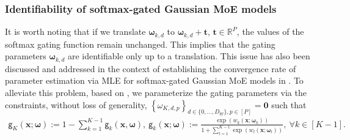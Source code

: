 \documentclass{article}
\newcommand{\mdg}{softmax-gated Gaussian MoE }
\newcommand{\zero}{\ensuremath{\mathbf{0}}}
\def\sfg{\mathsf{g}}
\def\vomega{{\bm{\omega}}}
\def\vt{{\bm{t}}}
\def\vx{{\bm{x}}}
\def\sR{{\mathbb{R}}}
\begin{document}
\subsubsection{Identifiability of \mdg models}\label{section_identifiability_SGMoE}
It is worth noting that if we translate $\vomega_{k,d}$ to $\vomega_{k,d}+\vt$, $\vt \in \sR^{P}$, the values of the softmax gating function remain unchanged. This implies that the gating parameters $\vomega_{k,d}$ are identifiable only up to a translation. This issue has also been discussed and addressed in the context of establishing the convergence rate of parameter estimation via MLE for \mdg models in \cite{nguyen_demystifying_2023}.
To alleviate this problem, based on \cite{hennig2000identifiablity,jiang1999identifiability}, we parameterize the gating parameters via the constraints, without loss of generality, $\left\{\omega_{K,d,p}\right\}_{d\in\{0,\ldots,D_W\},p\in [P]} = \zero$ such that
%
\begin{align*}
	\sfg_K\left(\vx;\vomega\right):= 1 - \sum_{k=1}^{K-1}\sfg_k\left(\vx, \vomega\right),~
	\sfg_k\left(\vx; \vomega \right):=  \frac{\exp\left(w_k(\vx; \vomega_k)\right)}{1+\sum_{l=1}^{K-1}\exp\left(w_l(\vx;\vomega_l)\right)}, ~\forall k \in [K-1].
\end{align*}
\end{document}
